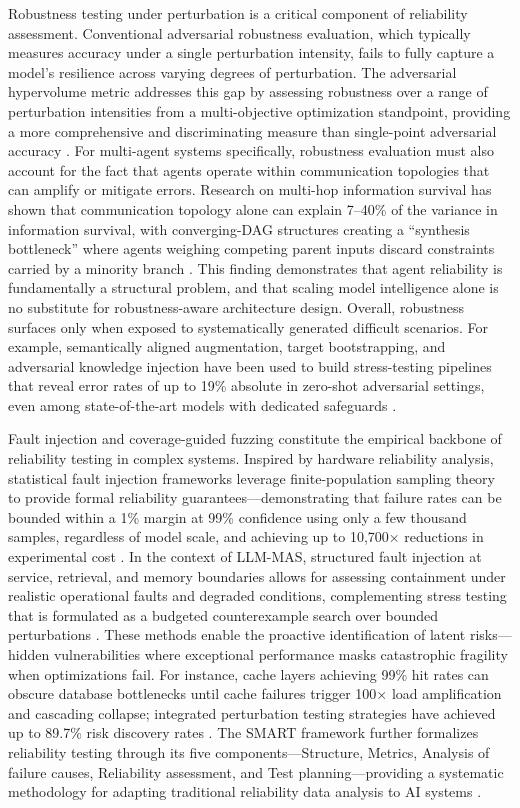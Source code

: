 \documentclass[11pt]{article}
\begin{document}
Robustness testing under perturbation is a critical component of reliability assessment. Conventional adversarial robustness evaluation, which typically measures accuracy under a single perturbation intensity, fails to fully capture a model's resilience across varying degrees of perturbation. The adversarial hypervolume metric addresses this gap by assessing robustness over a range of perturbation intensities from a multi-objective optimization standpoint, providing a more comprehensive and discriminating measure than single-point adversarial accuracy \cite{ref392}. For multi-agent systems specifically, robustness evaluation must also account for the fact that agents operate within communication topologies that can amplify or mitigate errors. Research on multi-hop information survival has shown that communication topology alone can explain 7--40\% of the variance in information survival, with converging-DAG structures creating a ``synthesis bottleneck'' where agents weighing competing parent inputs discard constraints carried by a minority branch \cite{ref347}. This finding demonstrates that agent reliability is fundamentally a structural problem, and that scaling model intelligence alone is no substitute for robustness-aware architecture design. Overall, robustness surfaces only when exposed to systematically generated difficult scenarios. For example, semantically aligned augmentation, target bootstrapping, and adversarial knowledge injection have been used to build stress-testing pipelines that reveal error rates of up to 19\% absolute in zero-shot adversarial settings, even among state-of-the-art models with dedicated safeguards \cite{ref393}.

Fault injection and coverage-guided fuzzing constitute the empirical backbone of reliability testing in complex systems. Inspired by hardware reliability analysis, statistical fault injection frameworks leverage finite-population sampling theory to provide formal reliability guarantees---demonstrating that failure rates can be bounded within a 1\% margin at 99\% confidence using only a few thousand samples, regardless of model scale, and achieving up to 10,700× reductions in experimental cost \cite{ref394}. In the context of LLM-MAS, structured fault injection at service, retrieval, and memory boundaries allows for assessing containment under realistic operational faults and degraded conditions, complementing stress testing that is formulated as a budgeted counterexample search over bounded perturbations \cite{ref395}. These methods enable the proactive identification of latent risks---hidden vulnerabilities where exceptional performance masks catastrophic fragility when optimizations fail. For instance, cache layers achieving 99\% hit rates can obscure database bottlenecks until cache failures trigger 100× load amplification and cascading collapse; integrated perturbation testing strategies have achieved up to 89.7\% risk discovery rates \cite{ref396}. The SMART framework further formalizes reliability testing through its five components---Structure, Metrics, Analysis of failure causes, Reliability assessment, and Test planning---providing a systematic methodology for adapting traditional reliability data analysis to AI systems \cite{ref397}.
\end{document}
